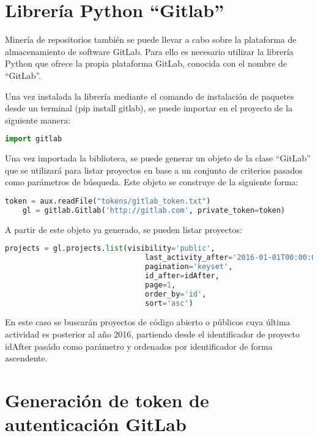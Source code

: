 \section{Librería Python ``Gitlab''}

Minería de repositorios también se puede llevar a cabo sobre la plataforma de almacenamiento de software GitLab. Para ello es necesario utilizar la librería Python que ofrece la propia plataforma GitLab, conocida con el nombre de ``GitLab''.

Una vez instalada la librería mediante el comando de instalación de paquetes desde un terminal (pip install gitlab), se puede importar en el proyecto de la siguiente manera:

\begin{lstlisting}[language=Python]
    import gitlab
\end{lstlisting}

Una vez importada la biblioteca, se puede generar un objeto de la clase ``GitLab'' que se utilizará para listar proyectos en base a un conjunto de criterios pasados como parámetros de búsqueda. Este objeto se construye de la siguiente forma:

\begin{lstlisting}[language=Python]
    token = aux.readFile("tokens/gitlab_token.txt")
    gl = gitlab.Gitlab('http://gitlab.com', private_token=token)
\end{lstlisting}

A partir de este objeto ya generado, se pueden listar proyectos:

\begin{lstlisting}[language=Python]
    projects = gl.projects.list(visibility='public', 
                                last_activity_after='2016-01-01T00:00:00Z', 
                                pagination='keyset', 
                                id_after=idAfter, 
                                page=1, 
                                order_by='id', 
                                sort='asc')
\end{lstlisting}

En este caso se buscarán proyectos de código abierto o públicos cuya última actividad es posterior al año 2016, partiendo desde el identificador de proyecto idAfter pasádo como parámetro y ordenados por identificador de forma ascendente.

\section{Generación de token de autenticación GitLab}

